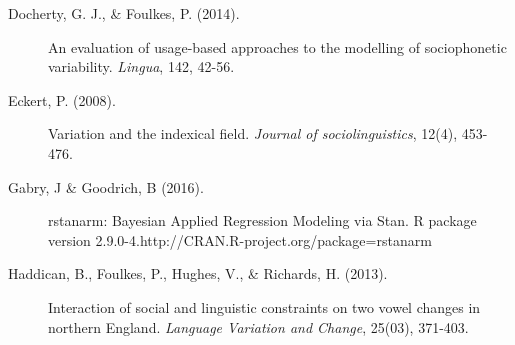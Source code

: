 \documentclass[a0,final]{a0poster}
\begin{document}
\begin{multicols*}{4}
\begin{description}
\item[Docherty, G. J., \& Foulkes, P. (2014).]{An evaluation of usage-based approaches to the modelling of sociophonetic variability. \textit{Lingua}, 142, 42-56.}

\item[Eckert, P. (2008).]{Variation and the indexical field. \textit{Journal of sociolinguistics}, 12(4), 453-476.}\vspace*{0.2cm}

\item[Gabry, J \& Goodrich, B (2016).]{rstanarm: Bayesian Applied Regression Modeling via Stan. R package version 2.9.0-4.http://CRAN.R-project.org/package=rstanarm}


\item[Haddican, B., Foulkes, P., Hughes, V., \& Richards, H. (2013).]{Interaction of social and linguistic constraints on two vowel changes in northern England. \textit{Language Variation and Change}, 25(03), 371-403.}


\end{description}
%
%

\end{multicols*}
\end{document}
